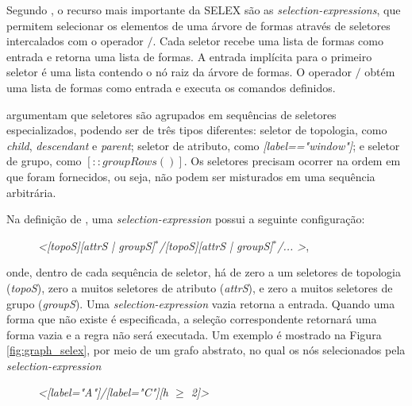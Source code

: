 Segundo , o recurso mais importante da \gls{SELEX} são as \textit{selection-expressions}, que permitem selecionar os elementos de uma árvore de formas através de seletores intercalados com o operador $/$. Cada seletor recebe uma lista de formas como entrada e retorna uma lista de formas. A entrada implícita para o primeiro seletor é uma lista contendo o nó raiz da árvore de formas. O operador $/$ obtém uma lista de formas como entrada e executa os comandos definidos. 

 argumentam que seletores são agrupados em sequências de seletores especializados, podendo ser de três tipos diferentes: seletor de topologia, como \textit{child}, \textit{descendant} e \textit{parent}; seletor de atributo, como \textit{[label=="window"]}; e seletor de grupo, como $[::groupRows()]$. Os seletores precisam ocorrer na ordem em que foram fornecidos, ou seja, não podem ser misturados em uma sequência arbitrária. 

Na definição de , uma \textit{selection-expression} possui a seguinte configuração:

\vspace{0.3cm}

\begin{description}
    \item[] \qquad \qquad \textit{<[topoS][attrS | groupS]$^*$/[topoS][attrS | groupS]$^*$/... >},
\end{description}

\vspace{0.3cm}

\noindent onde, dentro de cada sequência de seletor, há de zero a um seletores de topologia (\textit{topoS}), zero a muitos seletores de atributo (\textit{attrS}), e zero a muitos seletores de grupo (\textit{groupS}). Uma \textit{selection-expression} vazia retorna a entrada. Quando uma forma que não existe é especificada, a seleção correspondente retornará uma forma vazia e a regra não será executada. Um exemplo é mostrado na Figura \ref{fig:graph_selex}, por meio de um grafo abstrato, no qual os nós selecionados pela \textit{selection-expression} 

\vspace{0.3cm}

\begin{description}
    \item[] \qquad \qquad \textit{<[label="A"]/[label="C"][h $\geq$ 2]>}
\end{description}

